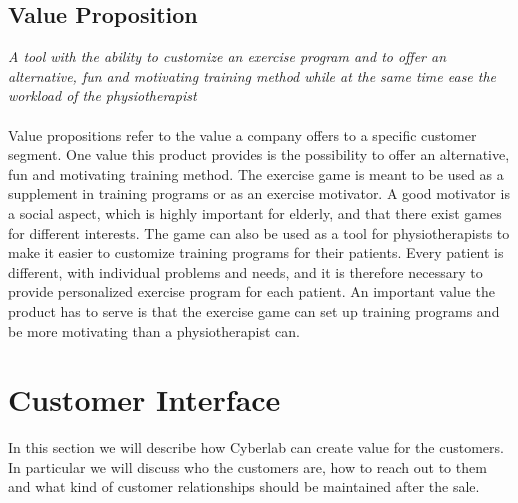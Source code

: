 \subsection{Value Proposition}
\emph{A tool with the ability to customize an exercise program and to offer an alternative, fun and motivating training method while at the same time ease the workload of the physiotherapist}\\ \\
Value propositions refer to the value a company offers to a specific customer segment. One value this product provides is the possibility to offer an alternative, fun and motivating training method. The exercise game is meant to be used as a supplement in training programs or as an exercise motivator. A good motivator is a social aspect, which is highly important for elderly, and that there exist games for different interests. The game can also be used as a tool for physiotherapists to make it easier to customize training programs for their patients. Every patient is different, with individual problems and needs, and it is therefore necessary to provide personalized exercise program for each patient. An important value the product has to serve is that the exercise game can set up training programs and be more motivating than a physiotherapist can. 
\section{Customer Interface}
In this section we will describe how Cyberlab can create value for the customers. In particular we will discuss who the customers are, how to reach out to them and what kind of customer relationships should be maintained after the sale. 
